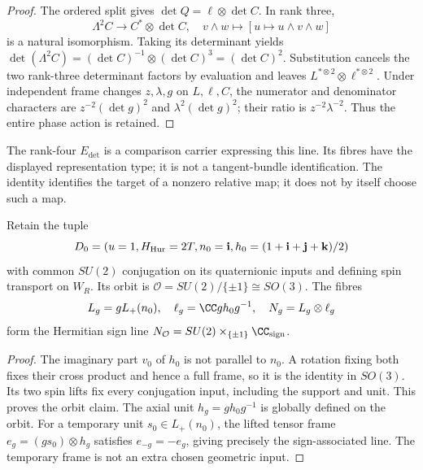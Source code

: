 \documentclass[11pt]{article}
\begin{document}
\begin{proof}
The ordered split gives \(\det Q=\ell\otimes\det C\).  In rank three,
\[
 \Lambda^2C\longrightarrow C^*\otimes\det C,
 \quad v\wedge w\longmapsto[u\mapsto u\wedge v\wedge w]
\]
is a natural isomorphism.  Taking its determinant yields
\(\det(\Lambda^2C)=(\det C)^{-1}\otimes(\det C)^3=(\det C)^2\).
Substitution cancels the two rank-three determinant factors by evaluation and
leaves \(L^{*\otimes2}\otimes\ell^{*\otimes2}\).  Under independent
frame changes \(z,\lambda,g\) on \(L,\ell,C\), the numerator and
denominator characters are \(z^{-2}(\det g)^2\) and
\(\lambda^2(\det g)^2\); their ratio is \(z^{-2}\lambda^{-2}\).
Thus the entire phase action is retained.
\end{proof}

The rank-four \(E_{\det}\) is a comparison carrier expressing this line.
Its fibres have the displayed representation type; it is not a tangent-bundle
identification.
The identity identifies the target of a nonzero relative map; it does not by
itself choose such a map.



\begin{theorem}
\label{p1:thm:joint-hopf-axial-orbit}
Retain the tuple
\[
 D_0=(u=1,H_{\rm Hur}=2T,n_0=\mathbf i,
 h_0=(1+\mathbf i+\mathbf j+\mathbf k)/2)
\]
with common \(SU(2)\) conjugation on its quaternionic inputs and defining
spin transport on \(W_R\).  Its orbit is
\(\mathcal O=SU(2)/\{\pm1\}\cong SO(3)\).
The fibres
\[
 L_g=gL_+(n_0),\quad \ell_g=\CC gh_0g^{-1},\quad N_g=L_g\otimes\ell_g
\]
form the Hermitian sign line
\(N_{\mathcal O}=SU(2)\times_{\{\pm1\}}\CC_{\rm sign}\).
\end{theorem}

\begin{proof}
The imaginary part \(v_0\) of \(h_0\) is not parallel to \(n_0\).
A rotation fixing both fixes their cross product and hence a full frame,
so it is the identity in \(SO(3)\).  Its two spin lifts fix every
conjugation input, including the support and unit.  This proves the orbit
claim.  The axial unit \(h_g=gh_0g^{-1}\) is globally defined on the orbit.
For a temporary unit \(s_0\in L_+(n_0)\), the lifted tensor frame
\(e_g=(gs_0)\otimes h_g\) satisfies \(e_{-g}=-e_g\), giving precisely
the sign-associated line.  The temporary frame is not an extra chosen
geometric input.
\end{proof}
\end{document}
